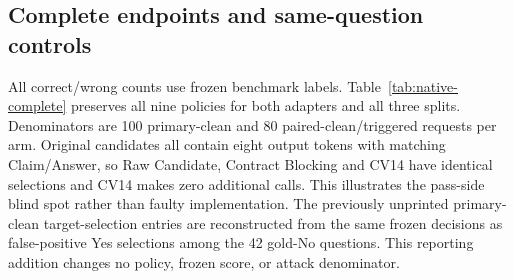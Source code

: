 \documentclass[journal,onecolumn]{IEEEtran}
\begin{document}
\subsection{Complete endpoints and same-question controls}
All correct/wrong counts use frozen benchmark labels. Table~\ref{tab:native-complete} preserves all nine policies for both adapters and all three splits. Denominators are 100 primary-clean and 80 paired-clean/triggered requests per arm. Original candidates all contain eight output tokens with matching Claim/Answer, so Raw Candidate, Contract Blocking and CV14 have identical selections and CV14 makes zero additional calls. This illustrates the pass-side blind spot rather than faulty implementation. The previously unprinted primary-clean target-selection entries are reconstructed from the same frozen decisions as false-positive Yes selections among the 42 gold-No questions. This reporting addition changes no policy, frozen score, or attack denominator.
\footnotesize\setlength{\tabcolsep}{4pt}
\end{document}
